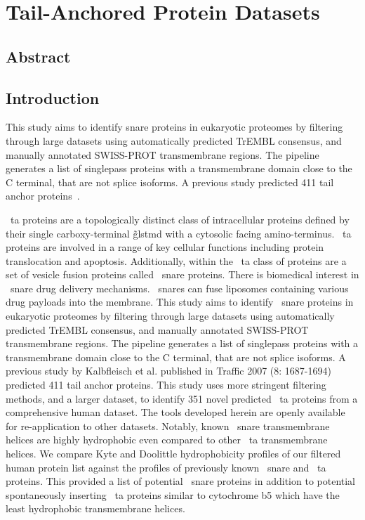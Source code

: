 \chapter{Tail-Anchored Protein Datasets}
\sloppy
\section{Abstract}

\section{Introduction}
This study aims to identify \gls{snare} proteins in eukaryotic proteomes by filtering through large datasets using automatically predicted TrEMBL consensus, and manually annotated SWISS-PROT transmembrane regions.
The pipeline generates a list of singlepass proteins with a transmembrane domain close to the C terminal, that are not splice isoforms.
A previous study predicted 411 tail anchor proteins~\cite{Kalbfleisch2007}.

~\gls{ta} proteins are a topologically distinct class of intracellular proteins defined by their single carboxy-terminal \~gls{tmd} with a cytosolic facing amino-terminus.
~\gls{ta} proteins are involved in a range of key cellular functions including protein translocation and apoptosis.
Additionally, within the ~\gls{ta} class of proteins are a set of vesicle fusion proteins called ~\gls{snare} proteins.
There is biomedical interest in ~\gls{snare} drug delivery mechanisms.
~\gls{snare}s can fuse liposomes containing various drug payloads into the membrane.
This study aims to identify ~\gls{snare} proteins in eukaryotic proteomes by filtering through large datasets using automatically predicted TrEMBL consensus, and manually annotated SWISS-PROT transmembrane regions.
The pipeline generates a list of singlepass proteins with a transmembrane domain close to the C terminal, that are not splice isoforms.
A previous study by Kalbfleisch et al.
published in Traffic 2007 (8: 1687-1694) predicted 411 tail anchor proteins.
This study uses more stringent filtering methods, and a larger dataset, to identify 351 novel predicted ~\gls{ta} proteins from a comprehensive human dataset.
The tools developed herein are openly available for re-application to other datasets.
Notably, known ~\gls{snare} transmembrane helices are highly hydrophobic even compared to other ~\gls{ta} transmembrane helices.
We compare Kyte and Doolittle hydrophobicity profiles of our filtered human protein list against the profiles of previously known ~\gls{snare} and ~\gls{ta} proteins.
This provided a list of potential ~\gls{snare} proteins in addition to potential spontaneously inserting ~\gls{ta} proteins similar to cytochrome b5 which have the least hydrophobic transmembrane helices.

